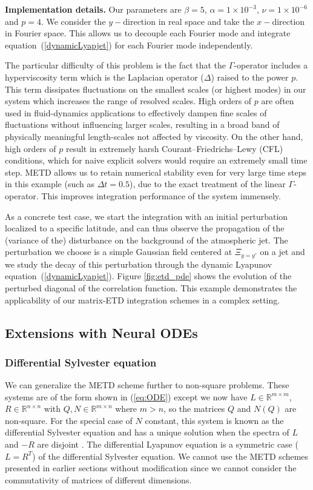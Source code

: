 \documentclass[12pt]{article}
\begin{document}
\textbf{Implementation details.} Our parameters are $\beta = 5$, $\alpha = 1 \times 10^{-3}$, $\nu = 1 \times 10^{-6} $ and $p=4$. We consider the $y-$direction in real space and take the $x-$direction in Fourier space. This allows us to decouple each Fourier mode and integrate equation~(\ref{dynamicLyapjet}) for each Fourier mode independently.

The particular difficulty of this problem is the fact that the $\Gamma$-operator includes a hyperviscosity term which is the Laplacian operator ($\Delta$) raised to the power $p$. This term dissipates fluctuations on the smallest scales (or highest modes) in our system which increases the range of resolved scales.  High orders of $p$ are often used in fluid-dynamics applications to effectively dampen fine scales of fluctuations without influencing larger scales, resulting in a broad band of physically meaningful length-scales not affected by viscosity. On the other hand, high orders of $p$ result in extremely harsh Courant–Friedrichs–Lewy (CFL) conditions, which for naive explicit solvers would require an extremely small time step. METD allows us to retain numerical stability even for very large time steps in this example (such as $\Delta t = 0.5$), due to the exact treatment of the linear $\Gamma$-operator. This improves integration performance of the system immensely.

As a concrete test case, we start the integration with an initial perturbation localized to a specific latitude, and can thus observe the propagation of the (variance of the) disturbance on the background of the atmospheric jet. The perturbation we choose is a simple Gaussian field centered at $\Xi_{y=y'}$ on a jet and we study the decay of this perturbation through the dynamic Lyapunov equation~(\ref{dynamicLyapjet}). Figure \ref{fig:etd_pde} shows the evolution of the perturbed diagonal of the correlation function. This example demonstrates the applicability of our matrix-ETD integration schemes in a complex setting.


\subsection{Extensions with Neural ODEs}

\subsubsection{Differential Sylvester equation}
We can generalize the METD scheme further to non-square problems. These systems are of the form shown in (\ref{eq:ODE}) except we now have $L \in  \mathbb{R}^{m \times m}$, $R \in  \mathbb{R}^{n \times n}$ with $Q,N \in  \mathbb{R}^{m \times n}$ where $m>n$, so the matrices $Q$ and $N(Q)$ are non-square. For the special case of $N$ constant, this system is known as the differential Sylvester equation and has a unique solution when the spectra of $L$ and $-R$ are disjoint \cite{behr_kyrlov}. The differential Lyapunov equation is a symmetric case ($L = R^T$) of the differential Sylvester equation. We cannot use the METD schemes presented in earlier sections without modification since we cannot consider the commutativity of matrices of different dimensions.
\end{document}
